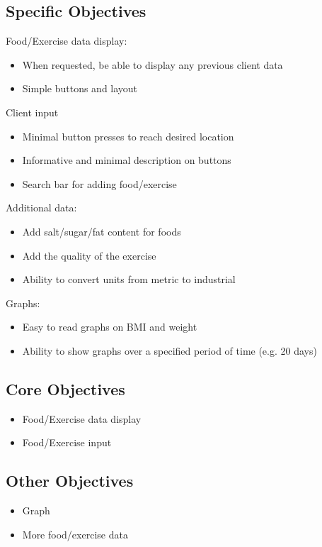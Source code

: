 \subsection{Specific Objectives}
Food/Exercise data display:

\begin{itemize}
\item When requested, be able to display any previous client data
\item Simple buttons and layout 
\end{itemize}

Client input
\begin{itemize}
\item Minimal button presses to reach desired location
\item Informative and minimal description on buttons
\item Search bar for adding food/exercise
\end{itemize}

Additional data:
\begin{itemize}
\item Add salt/sugar/fat content for foods
\item Add the quality of the exercise
\item Ability to convert units from metric to industrial
\end{itemize}

Graphs:
\begin{itemize}
\item Easy to read graphs on BMI and weight
\item Ability to show graphs over a specified period of time (e.g. 20 days)
\end{itemize}

\subsection{Core Objectives}

\begin{itemize}
\item Food/Exercise data display
\item Food/Exercise input
\end{itemize}

\subsection{Other Objectives}

\begin{itemize}
\item Graph
\item More food/exercise data
\end{itemize}

